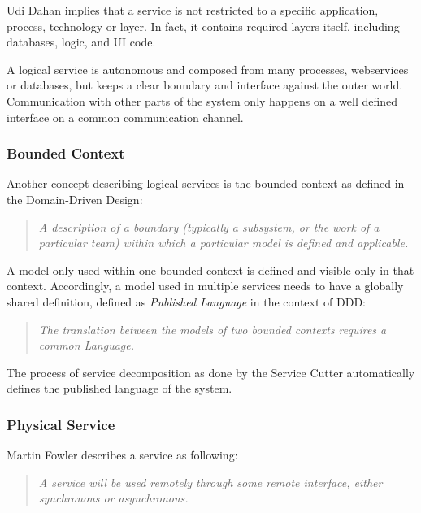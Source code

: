 Udi Dahan implies that a service is not restricted to a specific application, process, technology or layer. In fact, it contains required layers itself, including databases, logic, and \gls{UI} code.

A logical service is autonomous and composed from many processes, webservices or databases, but keeps a clear boundary and interface against the outer world. Communication with other parts of the system only happens on a well defined interface on a common communication channel.

\subsubsection{Bounded Context}

Another concept describing logical services is the bounded context as defined in the Domain-Driven Design\cite{evans2014domain}:

\begin{quotation}
	\textit{A description of a boundary (typically a subsystem, or the work of a particular team) within which a particular model is defined and applicable.}
\end{quotation}

A model only used within one bounded context is defined and visible only in that context. Accordingly, a model used in multiple services needs to have a globally shared definition, defined as \textit{Published Language} in the context of \gls{DDD}\cite{evans2014domain}:

\begin{quotation}
	\textit{The translation between the models of two bounded contexts requires a common Language.}
\end{quotation}

The process of service decomposition as done by the Service Cutter automatically defines the published language of the system. 

\subsubsection{Physical Service}

Martin Fowler describes a service as following:

\begin{quotation}
	\textit{A service will be used remotely through some remote interface, either synchronous or asynchronous.}\cite{fowlerIoC}
\end{quotation}

